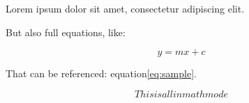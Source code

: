 Lorem ipsum dolor sit amet, consectetur adipiscing elit.

But also\cite{minsky2017perceptrons} full equations, like:

\begin{equation}
	\label{eq:sample}
	y = mx + c
\end{equation}

That can be referenced: equation\ref{eq:sample}.

$$This is all in math mode$$


